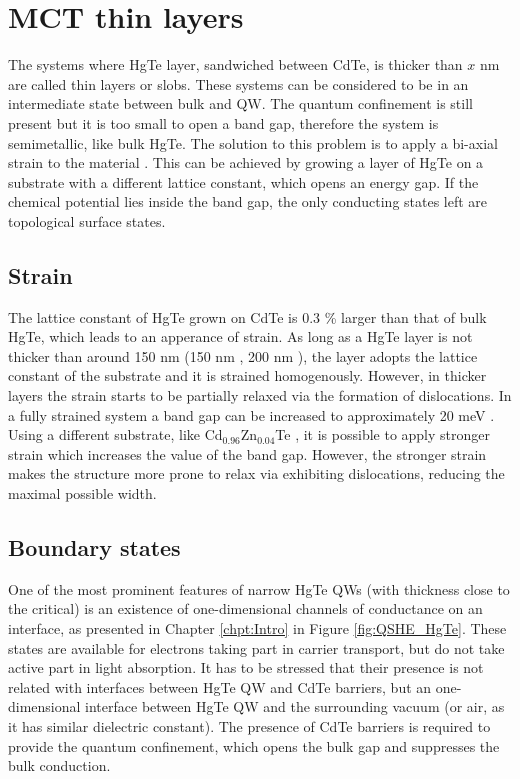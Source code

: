 \documentclass[titlepage,a4paper]{book}
\newcommand{\wciecie}{\quad\phantom{v}}
\begin{document}
\section{MCT thin layers}
\label{chpt:MCT_TL}
\wciecie
The systems where HgTe layer, sandwiched between CdTe, is thicker than $x$ nm are called thin layers or slobs. These systems can be considered to be in an intermediate state between bulk and QW. The quantum confinement is still present but it is too small to open a band gap, therefore the system is semimetallic, like bulk HgTe. The solution to this problem is to apply a bi-axial strain to the material \cite{Brune_State2}. This can be achieved by growing a layer of HgTe on a substrate with a different lattice constant, which opens an energy gap. If the chemical potential lies inside the band gap, the only conducting states left are topological surface states. 

\subsection{Strain}
\wciecie
The lattice constant of HgTe grown on CdTe is 0.3 \% larger than that of bulk HgTe, which leads to an apperance of strain. As long as a HgTe layer is not thicker than around 150 nm (150 nm \cite{Crauste_StrainedMCT}, 200 nm \cite{Brune_State2}), the layer adopts the lattice constant of the substrate and it is strained homogenously. However, in thicker layers the strain starts to be partially relaxed via the formation of dislocations. In a fully strained system a band gap can be increased to approximately 20 meV \cite{Brune_State2}\cite{Crauste_StrainedMCT}. Using a different substrate, like Cd$_{0.96}$Zn$_{0.04}$Te \cite{Leubner_State}, it is possible to apply stronger strain which increases the value of the band gap. However, the stronger strain makes the structure more prone to relax via exhibiting dislocations, reducing the maximal possible width.

\subsection{Boundary states}
\wciecie
One of the most prominent features of narrow HgTe QWs (with thickness close to the critical) is an existence of one-dimensional channels of conductance on an interface, as presented in Chapter \ref{chpt:Intro} in Figure \ref{fig:QSHE_HgTe}. These states are available for electrons taking part in carrier transport, but do not take active part in light absorption. It has to be stressed that their presence is not related with interfaces between HgTe QW and CdTe barriers, but an one-dimensional interface between HgTe QW and the surrounding vacuum (or air, as it has similar dielectric constant). The presence of CdTe barriers is required to provide the quantum confinement, which opens the bulk gap and suppresses the bulk conduction. 
\end{document}
